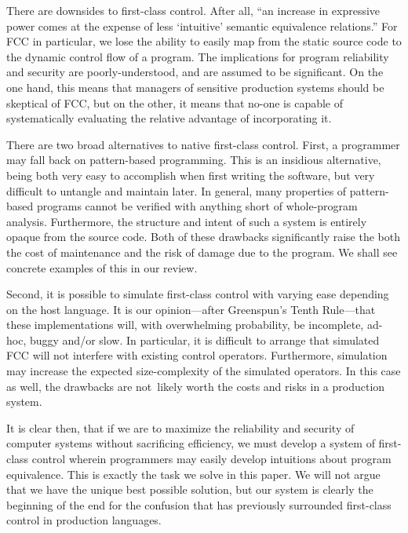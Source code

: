 \documentclass[11pt]{article}
\begin{document}
There are downsides to first-class control. After all, ``an increase in expressive power comes at the expense of less `intuitive' semantic equivalence relations.''\cite{Felleisen90expressive}
For FCC in particular, we lose the ability to easily map from the static source code to the dynamic control flow of a program.
The implications for program reliability and security are poorly-understood, and are assumed to be significant.
On the one hand, this means that managers of sensitive production systems should be skeptical of FCC, but on the other, it means that no-one is capable of systematically evaluating the relative advantage of incorporating it.

There are two broad alternatives to native first-class control.
First, a programmer may fall back on pattern-based programming.
This is an insidious alternative, being both very easy to accomplish when first writing the software, but very difficult to untangle and maintain later.
In general, many properties of pattern-based programs cannot be verified with anything short of whole-program analysis.
Furthermore, the structure and intent of such a system is entirely opaque from the source code.\cite{Felleisen90expressive}
Both of these drawbacks significantly raise the both the cost of maintenance and the risk of damage due to the program.
We shall see concrete examples of this in our review.

Second, it is possible to simulate first-class control with varying ease depending on the host language.
It is our opinion---after Greenspun's Tenth Rule---that these implementations will, with overwhelming probability, be incomplete, ad-hoc, buggy and/or slow.
In particular, it is difficult to arrange that simulated FCC will not interfere with existing control operators.\cite{addDelimControlProduction}
Furthermore, simulation may increase the expected size-complexity of the simulated operators.\cite{finalShiftForCallcc}
In this case as well, the drawbacks are not~likely worth the costs and risks in a production system.

It is clear then, that if we are to maximize the reliability and security of computer systems without sacrificing efficiency, we must develop a system of first-class control wherein programmers may easily develop intuitions about program equivalence.
This is exactly the task we solve in this paper.
We will not argue that we have the unique best possible solution, but our system is clearly the beginning of the end for the confusion that has previously surrounded first-class control in production languages.
\end{document}
